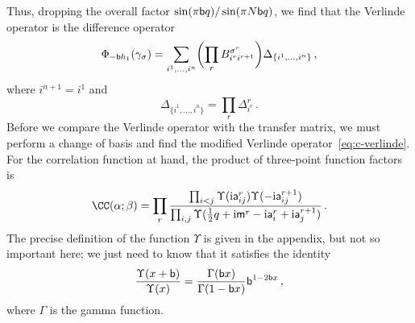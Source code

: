 Thus, dropping the overall factor $\sin(\pi \mathsf{b} q)/\sin(\pi N\mathsf{b} q)$, we
find that the Verlinde operator is the difference operator
\begin{equation}
  \Phi_{-\mathsf{b} h_1}(\gamma_\sigma)
  =
  \sum_{i^1, \dotsc, i^n}
  \biggl(\prod_r B^{\sigma^r}_{i^r i^{r+1}}\biggr)
  \Delta_{\{i^1,\dotsc,i^n\}}  \,,
\end{equation}
where $i^{n+1} = i^1$ and
\begin{equation}
  \Delta_{\{i^1,\dotsc,i^n\}}
  =
  \prod_r \Delta^r_{i^r} \,.
\end{equation}
Before we compare the Verlinde operator with the transfer matrix, we
must perform a change of basis and find the modified Verlinde
operator~\eqref{eq:c-verlinde}.  For the correlation function at hand,
the product of three-point function factors is
\begin{equation}
  \CC(\alpha; \beta)
  =
  \prod_r
  \frac{\prod_{i<j} \Upsilon(\iu \as^r_{ij}) \Upsilon(-\iu \as^{r+1}_{ij})}
        {\prod_{i,j} \Upsilon(\frac12 q + \iu \ms^r - \iu \as^r_i + \iu \as^{r+1}_j)}
  \,.
\end{equation}
The precise definition of the function $\Upsilon$ is given in the appendix,
but not so important here; we just need to know that it satisfies the identity
\begin{equation}
  \frac{\Upsilon(x + \mathsf{b})}{\Upsilon(x)}
  = \frac{\Gamma(\mathsf{b} x)}{\Gamma(1 - \mathsf{b} x)} \mathsf{b}^{1 - 2\mathsf{b} x} \,,
\end{equation}
where $\Gamma$ is the gamma function.

